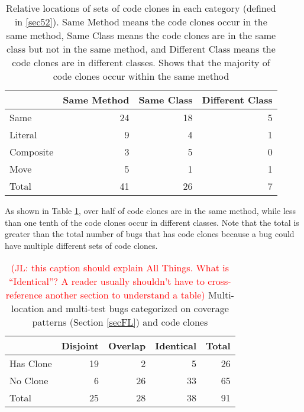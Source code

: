 \documentclass[sigconf, timestamp-false, anonymous=true]{acmart}
\newcommand\todo[1]{\textcolor{red}{#1}}
\begin{document}
\begin{table}
{\begin{center}
\begin{tabular} {lrrr}
\toprule
& Same Method & Same Class & Different Class \\
\hline
Same & 24 & 18 & 5  \\ 
Literal & 9 & 4 & 1  \\
Composite & 3 & 5 & 0  \\
Move & 5 & 1 & 1  \\
\midrule
Total & 41 & 26 & 7 \\
\bottomrule
\end{tabular}
\end{center}
}
\caption{
    Relative locations of sets of code clones in each category (defined in \ref{sec52}).
Same Method means the code clones occur in the same method, Same Class means the code
clones are in the same class but not in the same method, and Different Class means the
code clones are in different classes.
Shows that the majority of code clones occur within the same method}
\label{tab:clones_loc}
\end{table}

As shown in Table \ref{tab:clones_loc}, over half of code clones are in the same method, while less than
one tenth of the code clones occur in different classes. Note that the total is greater
than the total number of bugs that has code clones because a bug could have multiple different 
sets of code clones.

\begin{table}
	{\begin{center}
			\begin{tabular} {lrrrr}
				\toprule
				& Disjoint & Overlap & Identical & Total \\
				\midrule
				Has Clone & 19 & 2 & 5 & 26 \\
				No Clone & 6 & 26 & 33 &  65\\
                \midrule
				Total & 25 & 28 & 38 & 91 \\
                \bottomrule
			\end{tabular}
		\end{center}
	}
	\caption{\todo{(JL: this caption should explain All Things. What is
        ``Identical''? A reader usually shouldn't have to cross-reference another
        section to understand a table)} Multi-location and multi-test bugs categorized on coverage patterns (Section 
		\ref{secFL}) and code clones}
	\label{tab:cov_clones}
\end{table}
\end{document}
